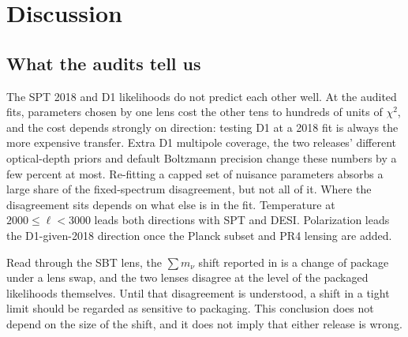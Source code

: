 \documentclass[11pt]{article}
\theoremstyle{remark}
\newcommand{\mnu}{\sum m_\nu}
\numberwithin{equation}{section}
\begin{document}
 \section{Discussion}
\label{sec:discussion}

\subsection{What the audits tell us}
The SPT 2018 and D1 likelihoods do not predict each other well. At the audited fits, parameters chosen by one lens cost the other tens to hundreds of units of $\chi^2$, and the cost depends strongly on direction: testing D1 at a 2018 fit is always the more expensive transfer. Extra D1 multipole coverage, the two releases' different optical-depth priors and default Boltzmann precision change these numbers by a few percent at most. Re-fitting a capped set of nuisance parameters absorbs a large share of the fixed-spectrum disagreement, but not all of it. Where the disagreement sits depends on what else is in the fit. Temperature at $2000\le\ell<3000$ leads both directions with SPT and DESI. Polarization leads the D1-given-2018 direction once the Planck subset and PR4 lensing are added.

Read through the SBT lens, the $\mnu$ shift reported in \cite{arxiv2601_16277} is a change of package under a lens swap, and the two lenses disagree at the level of the packaged likelihoods themselves. Until that disagreement is understood, a shift in a tight limit should be regarded as sensitive to packaging. This conclusion does not depend on the size of the shift, and it does not imply that either release is wrong.
\end{document}
